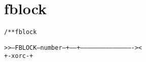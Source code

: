 \section{fblock}
\begin{shaded}
\begin{alltt}
/** fblock

   >>--FBLOCK--number--+------+-------------------------------------------><
                       +-xorc-+

\end{alltt}
\end{shaded}
